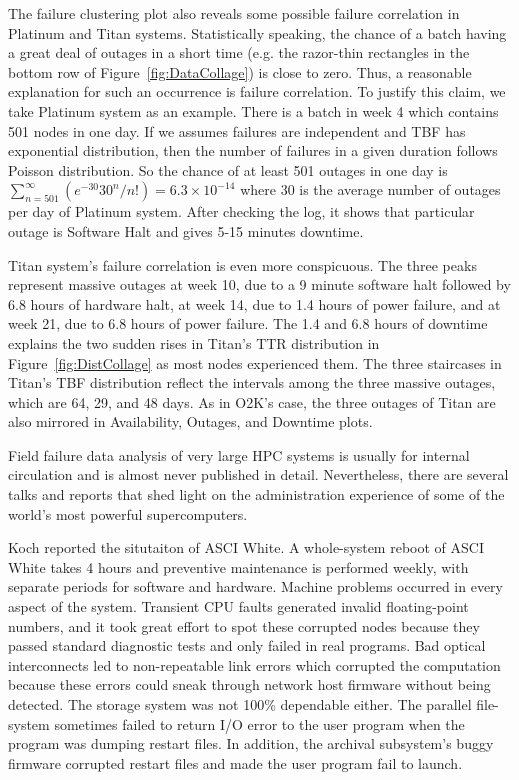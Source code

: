 \documentclass[10pt,twocolumn]{article}
\begin{document}
The failure clustering plot also reveals some 
possible failure correlation in Platinum and 
Titan systems. Statistically speaking, the chance
of a batch having a great deal of outages in a 
short time (e.g. the razor-thin rectangles in 
the bottom row of Figure~\ref{fig:DataCollage}) is 
close to zero. Thus, a reasonable explanation for such 
an occurrence is failure correlation. To justify this 
claim, we take Platinum system as an example. There is 
a batch in week 4 which contains 501 nodes in one day. 
If we assumes failures are independent and TBF 
has exponential distribution, then the number of
failures in a given duration follows Poisson distribution.
So the chance of at least 501 outages in 
one day is 
$\sum_{n=501}^{\infty} (e^{-30} 30^{n}/n!) = 6.3 \times 10^{-14}$
where $30$ is the average number of outages per day
of Platinum system. After checking the log, it
shows that particular outage is Software Halt and gives
5-15 minutes downtime.

Titan system's failure correlation is even more
conspicuous. The three peaks represent massive
outages at week 10, due to a 9 minute software halt
followed by 6.8 hours of hardware halt, at week
14, due to 1.4 hours of power failure, and at week
21, due to 6.8 hours of power failure. The 1.4 and
6.8 hours of downtime explains the two sudden rises
in Titan's TTR distribution in Figure~\ref{fig:DistCollage}
as most nodes experienced them.
The three staircases in Titan's TBF distribution reflect
the intervals among the three massive outages, which
are 64, 29, and 48 days. As in O2K's case, the three
outages of Titan are also mirrored in Availability, 
Outages, and Downtime plots.

\label{s:rel}
Field failure data analysis of very large HPC systems
is usually for internal circulation and is almost never 
published in detail. Nevertheless, there are several talks 
and reports that shed light on the administration experience
of some of the world's most powerful supercomputers. 

Koch \cite{Koch:02} reported the situtaiton of ASCI White.
A whole-system reboot of ASCI White takes 4 hours and 
preventive maintenance is performed weekly, with separate 
periods for software and hardware. Machine problems occurred 
in every aspect of the system. Transient CPU faults 
generated invalid floating-point numbers, and it took 
great effort to spot these corrupted nodes because they passed 
standard diagnostic tests and only failed in real programs. 
Bad optical interconnects led to non-repeatable link errors 
which corrupted the computation because these errors could 
sneak through network host firmware without being detected. 
The storage system was not 100\% dependable either. 
The parallel file-system sometimes failed to return I/O error 
to the user program when the program was dumping restart files. 
In addition, the archival subsystem's buggy firmware corrupted 
restart files and made the user program fail to launch. 
\end{document}
